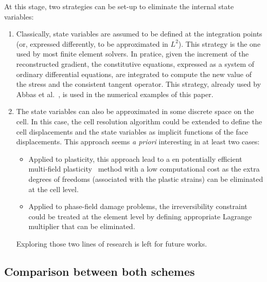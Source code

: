 At this stage, two strategies can be set-up to eliminate the internal
state variables:
\begin{enumerate}
  \item Classically, state variables are assumed to be defined at
  the integration points (or, expressed differently, to be approximated
  in \(L^{2}\)). This strategy is the one used by most finite element
  solvers. In pratice, given the increment of the reconstructed
  gradient, the constitutive equations, expressed as a system of
  ordinary differential equations, are integrated to compute the new
  value of the stress and the consistent tangent operator. This
  strategy, already used by Abbas et
  al.~\cite{abbas_hybrid_2018,abbas_hybrid_2019}, is used in the
  numerical examples of this paper.
  \item The state variables can also be approximated in some
  discrete space on the cell. In this case, the cell resolution
  algorithm could be extended to define the cell displacements and the
  state variables as implicit functions of the face displacements. This
  approach seems \emph{a priori} interesting in at least two cases:
  \begin{itemize}
    \item Applied to plasticity, this approach lead to a en
    potentially efficient multi-field
    plasticity~\cite{simo_computational_1998} method with a low
    computational cost as the extra degrees of freedoms (associated with
    the plastic strains) can be eliminated at the cell level.
    \item Applied to phase-field damage problems, the
    irreversibility constraint could be treated at the element level by
    defining appropriate Lagrange multiplier that can be eliminated.
  \end{itemize}
  Exploring those two lines of research is left for future
  works.
\end{enumerate}


\subsection{Comparison between both schemes}
\label{par_cell_eq}

